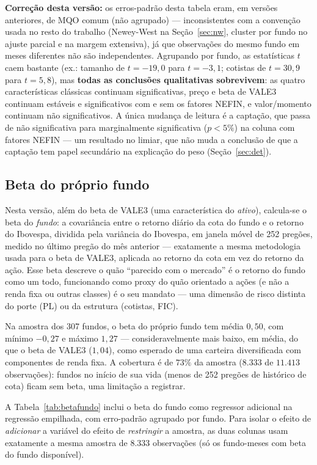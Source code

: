 \documentclass[12pt,a4paper]{article}
\begin{document}
\textbf{Correção desta versão:} os erros-padrão desta tabela eram, em versões anteriores, de MQO
comum (não agrupado) --- inconsistentes com a convenção usada no resto do trabalho (Newey-West na
Seção~\ref{sec:nw}, cluster por fundo no ajuste parcial e na margem extensiva), já que
observações do mesmo fundo em meses diferentes não são independentes. Agrupando por fundo, as
estatísticas $t$ caem bastante (ex.: tamanho de $t=-19{,}0$ para $t=-3{,}1$; cotistas de
$t=30{,}9$ para $t=5{,}8$), mas \textbf{todas as conclusões qualitativas sobrevivem}: as quatro
características clássicas continuam significativas, preço e beta de VALE3 continuam estáveis e
significativos com e sem os fatores NEFIN, e valor/momento continuam não significativos. A única
mudança de leitura é a captação, que passa de não significativa para marginalmente significativa
($p<5\%$) na coluna com fatores NEFIN --- um resultado no limiar, que não muda a conclusão de que
a captação tem papel secundário na explicação do peso (Seção~\ref{sec:det}).

\subsection{Beta do próprio fundo}
\label{sec:betafundo}

Nesta versão, além do beta de VALE3 (uma característica do \emph{ativo}), calcula-se o
beta do \emph{fundo}: a covariância entre o retorno diário da cota do fundo e o retorno do
Ibovespa, dividida pela variância do Ibovespa, em janela móvel de 252 pregões, medido no último
pregão do mês anterior --- exatamente a mesma metodologia usada para o beta de VALE3, aplicada
ao retorno da cota em vez do retorno da ação. Esse beta descreve o quão ``parecido com o
mercado'' é o retorno do fundo como um todo, funcionando como proxy do quão orientado a ações
(e não a renda fixa ou outras classes) é o seu mandato --- uma dimensão de risco distinta do
porte (PL) ou da estrutura (cotistas, FIC).

Na amostra dos 307 fundos, o beta do próprio fundo tem média $0{,}50$, com mínimo $-0{,}27$ e
máximo $1{,}27$ --- consideravelmente mais baixo, em média, do que o beta de VALE3 ($1{,}04$),
como esperado de uma carteira diversificada com componentes de renda fixa. A cobertura é de
$73\%$ da amostra ($8.333$ de $11.413$ observações): fundos no início de sua vida (menos de 252
pregões de histórico de cota) ficam sem beta, uma limitação a registrar.

A Tabela~\ref{tab:betafundo} inclui o beta do fundo como regressor adicional na regressão
empilhada, com erro-padrão agrupado por fundo. Para isolar o efeito de \emph{adicionar} a
variável do efeito de \emph{restringir} a amostra, as duas colunas usam exatamente a mesma
amostra de $8.333$ observações (só os fundo-meses com beta do fundo disponível).
\end{document}
